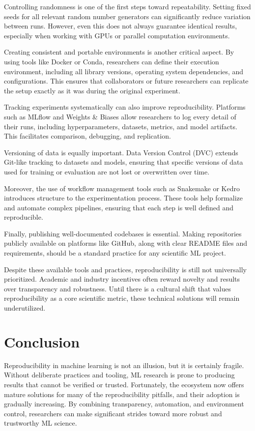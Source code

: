 \documentclass[11pt]{article}
\begin{document}
Controlling randomness is one of the first steps toward repeatability. Setting fixed seeds for all relevant random number generators can significantly reduce variation between runs. However, even this does not always guarantee identical results, especially when working with GPUs or parallel computation environments.

Creating consistent and portable environments is another critical aspect. By using tools like Docker or Conda, researchers can define their execution environment, including all library versions, operating system dependencies, and configurations. This ensures that collaborators or future researchers can replicate the setup exactly as it was during the original experiment.

Tracking experiments systematically can also improve reproducibility. Platforms such as MLflow and Weights \& Biases allow researchers to log every detail of their runs, including hyperparameters, datasets, metrics, and model artifacts. This facilitates comparison, debugging, and replication.

Versioning of data is equally important. Data Version Control (DVC) extends Git-like tracking to datasets and models, ensuring that specific versions of data used for training or evaluation are not lost or overwritten over time.

Moreover, the use of workflow management tools such as Snakemake or Kedro introduces structure to the experimentation process. These tools help formalize and automate complex pipelines, ensuring that each step is well defined and reproducible.

Finally, publishing well-documented codebases is essential. Making repositories publicly available on platforms like GitHub, along with clear README files and requirements, should be a standard practice for any scientific ML project.

Despite these available tools and practices, reproducibility is still not universally prioritized. Academic and industry incentives often reward novelty and results over transparency and robustness. Until there is a cultural shift that values reproducibility as a core scientific metric, these technical solutions will remain underutilized.


\section{Conclusion}
\label{sec:conclusion}
Reproducibility in machine learning is not an illusion, but it is certainly fragile. Without deliberate practices and tooling, ML research is prone to producing results that cannot be verified or trusted. Fortunately, the ecosystem now offers mature solutions for many of the reproducibility pitfalls, and their adoption is gradually increasing. By combining transparency, automation, and environment control, researchers can make significant strides toward more robust and trustworthy ML science.

% 

\end{document}

